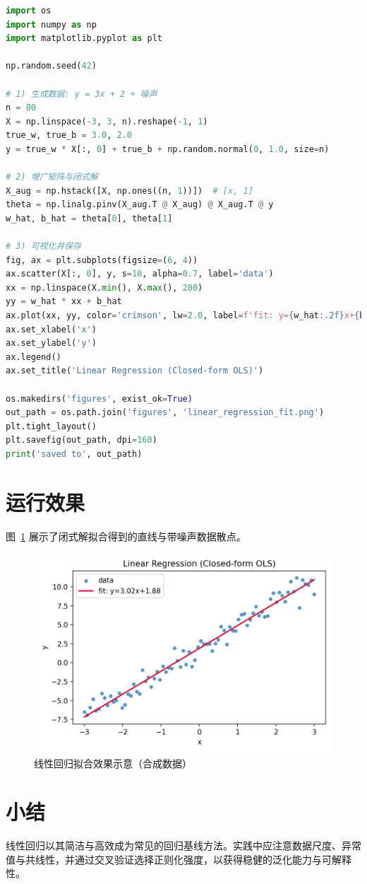 \documentclass[UTF8,zihao=-4]{ctexart}
\begin{document}
\begin{lstlisting}[language=Python,caption={linear_regression_closed_form.py}]
import os
import numpy as np
import matplotlib.pyplot as plt

np.random.seed(42)

# 1) 生成数据: y = 3x + 2 + 噪声
n = 80
X = np.linspace(-3, 3, n).reshape(-1, 1)
true_w, true_b = 3.0, 2.0
y = true_w * X[:, 0] + true_b + np.random.normal(0, 1.0, size=n)

# 2) 增广矩阵与闭式解
X_aug = np.hstack([X, np.ones((n, 1))])  # [x, 1]
theta = np.linalg.pinv(X_aug.T @ X_aug) @ X_aug.T @ y
w_hat, b_hat = theta[0], theta[1]

# 3) 可视化并保存
fig, ax = plt.subplots(figsize=(6, 4))
ax.scatter(X[:, 0], y, s=18, alpha=0.7, label='data')
xx = np.linspace(X.min(), X.max(), 200)
yy = w_hat * xx + b_hat
ax.plot(xx, yy, color='crimson', lw=2.0, label=f'fit: y={w_hat:.2f}x+{b_hat:.2f}')
ax.set_xlabel('x')
ax.set_ylabel('y')
ax.legend()
ax.set_title('Linear Regression (Closed-form OLS)')

os.makedirs('figures', exist_ok=True)
out_path = os.path.join('figures', 'linear_regression_fit.png')
plt.tight_layout()
plt.savefig(out_path, dpi=160)
print('saved to', out_path)
\end{lstlisting}

\section{运行效果}
图~\ref{fig:fit} 展示了闭式解拟合得到的直线与带噪声数据散点。

\begin{figure}[h]
  \centering
  \includegraphics[width=0.75\linewidth]{linear_regression_fit.png}
  \caption{线性回归拟合效果示意（合成数据）}
  \label{fig:fit}
\end{figure}

\section{小结}
线性回归以其简洁与高效成为常见的回归基线方法。实践中应注意数据尺度、异常值与共线性，并通过交叉验证选择正则化强度，以获得稳健的泛化能力与可解释性。
\end{document}
